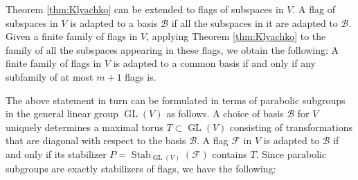 \documentclass[12pt]{amsart}
\theoremstyle{definition}
\theoremstyle{remark}
\newcommand{\R}{\mathbb{R}}
\newcommand{\Kiu}[1]{{\color{blue}(K: #1)}}
\def \R{\mathbb{R}}
\begin{document}



Theorem \ref{thm:Klyachko} can be extended to flags of subspaces in $V$. A flag of subspaces in $V$ is adapted to a basis $\mathcal{B}$ if all the subspaces in it are adapted to $\mathcal{B}$. Given a finite family of flags in $V$, applying Theorem \ref{thm:Klyachko} to the family of all the subspaces appearing in these flags, we obtain the following: 
A finite family of flags in $V$ is adapted to a common basis if and only if any  subfamily of at most $m+1$ flags is. 

The above statement in turn can be formulated in terms of parabolic subgroups in  the general linear group $\operatorname{GL}(V)$ as follows. A choice of basis $\mathcal{B}$ for $V$ uniquely determines a maximal torus $T \subset \operatorname{GL}(V)$ consisting of transformations that are diagonal with respect to the basis $\mathcal{B}$. A flag $\mathcal{F}$ in $V$ is adapted to $\mathcal{B}$ if and only if its stabilizer $P = \operatorname{Stab}_{\operatorname{GL}(V)}(\mathcal{F})$ contains $T$. Since parabolic subgroups are exactly stabilizers of flags, we have the following:
\end{document}
